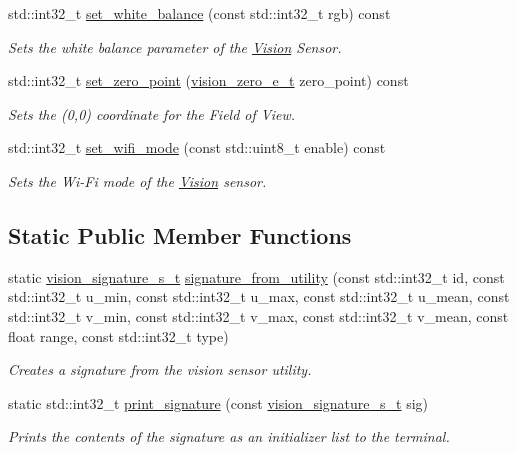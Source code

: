 \begin{DoxyCompactItemize}
std\+::int32\+\_\+t \hyperlink{classpros_1_1Vision_a923fc18c2b50a42b9c5c6292a476c9b5}{set\+\_\+white\+\_\+balance} (const std\+::int32\+\_\+t rgb) const
\begin{DoxyCompactList}\small\item\em Sets the white balance parameter of the \hyperlink{classpros_1_1Vision}{Vision} Sensor. \end{DoxyCompactList}\item 
std\+::int32\+\_\+t \hyperlink{classpros_1_1Vision_a89e0a23b112b8632171ef27cc6f57a6c}{set\+\_\+zero\+\_\+point} (\hyperlink{vision_8h_a2e8bc1c48f8aab12275bfc1868fbbad6}{vision\+\_\+zero\+\_\+e\+\_\+t} zero\+\_\+point) const
\begin{DoxyCompactList}\small\item\em Sets the (0,0) coordinate for the Field of View. \end{DoxyCompactList}\item 
std\+::int32\+\_\+t \hyperlink{classpros_1_1Vision_aa41af827ad6f9d6c050ca28c51d173ad}{set\+\_\+wifi\+\_\+mode} (const std\+::uint8\+\_\+t enable) const
\begin{DoxyCompactList}\small\item\em Sets the Wi-\/\+Fi mode of the \hyperlink{classpros_1_1Vision}{Vision} sensor. \end{DoxyCompactList}\end{DoxyCompactItemize}
\subsection*{Static Public Member Functions}
\begin{DoxyCompactItemize}
\item 
static \hyperlink{vision_8h_a135c729c7277f6cc019c2924088a5fd5}{vision\+\_\+signature\+\_\+s\+\_\+t} \hyperlink{classpros_1_1Vision_aa46f3bfb4956c7061b34764c92fc68fd}{signature\+\_\+from\+\_\+utility} (const std\+::int32\+\_\+t id, const std\+::int32\+\_\+t u\+\_\+min, const std\+::int32\+\_\+t u\+\_\+max, const std\+::int32\+\_\+t u\+\_\+mean, const std\+::int32\+\_\+t v\+\_\+min, const std\+::int32\+\_\+t v\+\_\+max, const std\+::int32\+\_\+t v\+\_\+mean, const float range, const std\+::int32\+\_\+t type)
\begin{DoxyCompactList}\small\item\em Creates a signature from the vision sensor utility. \end{DoxyCompactList}\item 
static std\+::int32\+\_\+t \hyperlink{classpros_1_1Vision_ada22311366ce088fa9ac08a8e3510800}{print\+\_\+signature} (const \hyperlink{vision_8h_a135c729c7277f6cc019c2924088a5fd5}{vision\+\_\+signature\+\_\+s\+\_\+t} sig)
\begin{DoxyCompactList}\small\item\em Prints the contents of the signature as an initializer list to the terminal. \end{DoxyCompactList}\end{DoxyCompactItemize}


